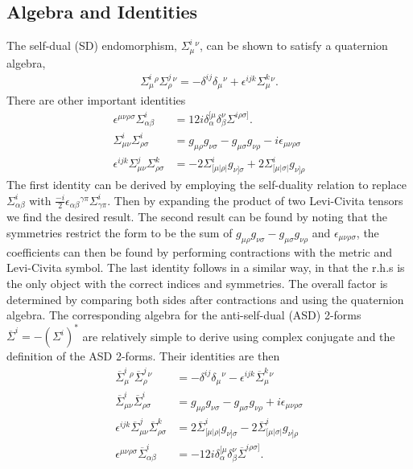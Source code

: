 \documentclass[10pt]{report}
\theoremstyle{definition}
\newcommand{\asd}[0]{\overline{\Sigma}}
\begin{document}
\subsection{Algebra and Identities}
The self-dual (SD) endomorphism, $\Sigma^i_\mu{}^\nu$, can be shown to satisfy a quaternion algebra,
\begin{align}
    \Sigma^i_\mu{}^\rho \Sigma^j_\rho{}^\nu = -\delta^{ij} \delta_\mu{}^\nu + \epsilon^{ijk} \Sigma^k_\mu{}^{\nu}. \label{eq:pleb-quaterion-algebra}
\end{align}
There are other important identities
\begin{align}
    \epsilon^{\mu\nu\rho\sigma} \Sigma^i_{\alpha\beta} & = 12 i \delta_\alpha^{[\mu} \delta_\beta^{\nu} \Sigma^{i\rho\sigma]}. \label{eq:pleb-epsilon-S-to-ddS}\\
    \Sigma^i_{\mu\nu} \Sigma^i_{\rho\sigma} & = g_{\mu\rho} g_{\nu\sigma} - g_{\mu\sigma} g_{\nu\rho} -i \epsilon_{\mu\nu\rho\sigma} \\
    \epsilon^{ijk} \Sigma^j_{\mu\nu} \Sigma^k_{\rho\sigma} & = -2\Sigma^i_{[\mu|\rho|} g_{\nu]\sigma} + 2\Sigma^i_{[\mu|\sigma|} g_{\nu]\rho} 
\end{align}
The first identity can be derived by employing the self-duality relation to replace $\Sigma^i_{\alpha\beta}$ with $\frac{-i}{2} \epsilon_{\alpha\beta}{}^{\gamma\pi} \Sigma^i_{\gamma\pi}$. Then by expanding the product of two Levi-Civita tensors we find the desired result. The second result can be found by noting that the symmetries restrict the form to be the sum of $g_{\mu\rho} g_{\nu\sigma} - g_{\mu\sigma} g_{\nu\rho}$ and $\epsilon_{\mu\nu\rho\sigma}$, the coefficients can then be found by performing contractions with the metric and Levi-Civita symbol. The last identity follows in a similar way, in that the r.h.s is the only object with the correct indices and symmetries. The overall factor is determined by comparing both sides after contractions and using the quaternion algebra. The corresponding algebra for the anti-self-dual (ASD) 2-forms $\asd^i = -(\Sigma^i)^*$ are relatively simple to derive using complex conjugate and the definition of the ASD 2-forms. Their identities are then
\begin{equation}
\begin{aligned}
    \asd^i_\mu{}^\rho \asd^j_\rho{}^\nu & = -\delta^{ij} \delta_\mu{}^\nu - \epsilon^{ijk} \asd^k_\mu{}^{\nu} \\
    \asd^i_{\mu\nu} \asd^i_{\rho\sigma} & = g_{\mu\rho} g_{\nu\sigma} - g_{\mu\sigma} g_{\nu\rho} + i \epsilon_{\mu\nu\rho\sigma} \\
    \epsilon^{ijk} \asd^j_{\mu\nu} \asd^k_{\rho\sigma} & = 2\asd^i_{[\mu|\rho|} g_{\nu]\sigma} - 2\asd^i_{[\mu|\sigma|} g_{\nu]\rho} \\
    \epsilon^{\mu\nu\rho\sigma} \asd^i_{\alpha\beta} & = -12 i \delta_\alpha^{[\mu} \delta_\beta^{\nu} \asd^{i\rho\sigma]}.
\end{aligned}
\end{equation}
\end{document}
